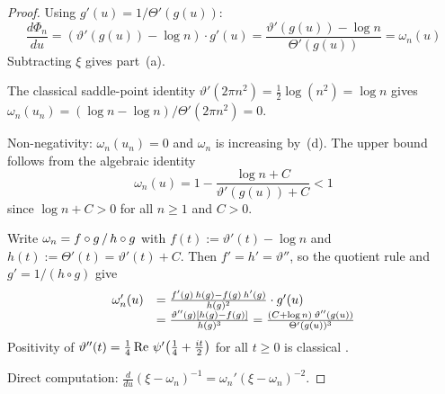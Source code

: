 \documentclass{amsart}
\newcommand{\assign}{:=}
\newcommand{\tmop}[1]{\ensuremath{\operatorname{#1}}}
\newcommand{\tmtextbf}[1]{\text{{\bfseries{#1}}}}
\newcommand{\Rea}{\tmop{Re}}
\begin{document}
\begin{proof}
  \tmtextbf{(a).} Using $g' (u) = 1 / \Theta' (g (u))$:
  \begin{equation}
    \frac{d \Phi_n}{du} = (\vartheta' (g (u)) - \log n) \cdot g' (u) =
    \frac{\vartheta' (g (u)) - \log n}{\Theta' (g (u))} = \omega_n (u)
  \end{equation}
  Subtracting $\xi$ gives part~(a).
  
  {\noindent}\tmtextbf{(b).} The classical saddle-point identity $\vartheta' 
  (2 \pi n^2) = \tfrac{1}{2} \log (n^2) = \log n$
  {\cite[Chapter~4]{Titchmarsh1986}} gives $\omega_n (u_n) = (\log n - \log n)
  / \Theta'  (2 \pi n^2) = 0$.
  
  {\noindent}\tmtextbf{(c).} Non-negativity: $\omega_n (u_n) = 0$ and
  $\omega_n$ is increasing by~(d). The upper bound follows from the algebraic
  identity
  \begin{equation}
    \omega_n (u) = 1 - \frac{\log n + C}{\vartheta' (g (u)) + C} < 1
  \end{equation}
  since $\log n + C > 0$ for all $n \ge 1$ and $C > 0$.
  
  {\noindent}\tmtextbf{(d).} Write $\omega_n = f \circ g \hspace{0.17em} /
  \hspace{0.17em} h \circ g$ with $f (t) \assign \vartheta' (t) - \log n$ and
  $h (t) \assign \Theta' (t) = \vartheta' (t) + C$. Then $f' = h' =
  \vartheta''$, so the quotient rule and $g' = 1 / (h \circ g)$ give
  \begin{equation}
    \begin{array}{ll}
      \omega_n' (u) & = \frac{f' (g)  \hspace{0.17em} h (g) - f (g) 
      \hspace{0.17em} h' (g)}{h (g)^2} \cdot g' (u)\\
      & = \frac{\vartheta'' (g)  [h (g) - f (g)]}{h (g)^3} = \frac{(C + \log
      n)  \hspace{0.17em} \vartheta'' (g (u))}{\Theta' (g (u))^3}
    \end{array}
  \end{equation}
  Positivity of $\vartheta'' (t) = \tfrac{1}{4} \Rea \hspace{0.17em} \psi' 
  \hspace{-0.17em} \left( \tfrac{1}{4} + \tfrac{it}{2} \right)$ for all $t \ge
  0$ is classical {\cite[5.15.3]{DLMF}}.
  
  {\noindent}\tmtextbf{(e).} Direct computation: $\tfrac{d}{du} (\xi -
  \omega_n)^{- 1} = \omega_n'  (\xi - \omega_n)^{- 2}$.
\end{proof}
\end{document}
